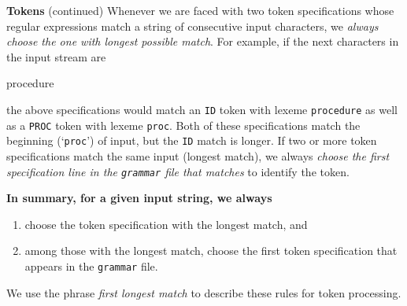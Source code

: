 \begin{minipage}[t]{\sw}
\slidenumber
\LARGE
{\bf Tokens} (continued)\exx
Whenever we are faced with two token specifications
whose regular expressions match a string of consecutive input characters,
we {\em always choose the one with longest possible match}.
For example, if the next characters in the input stream are
\begin{qv}
procedure
\end{qv}
the above specifications would match an \verb'ID' token
with lexeme \verb'procedure' as well as a \verb'PROC' token
with lexeme \verb'proc'.
Both of these specifications match the beginning (`\verb'proc'') of input,
but the \verb'ID' match is longer.\exx
If two or more token specifications
match the same input (longest match), we always
{\em choose the first specification line
in the \verb'grammar' file that matches} to identify the token.\exx
{\bf In summary, for a given input string, we always
\begin{enumerate}
\item choose the token specification with the longest match, and
\item among those with the longest match, 
      choose the first token specification 
      that appears in the \verb'grammar' file.
\end{enumerate}
We use the phrase {\em first longest match}
to describe these rules for token processing.}
\end{minipage}
\clearpage
